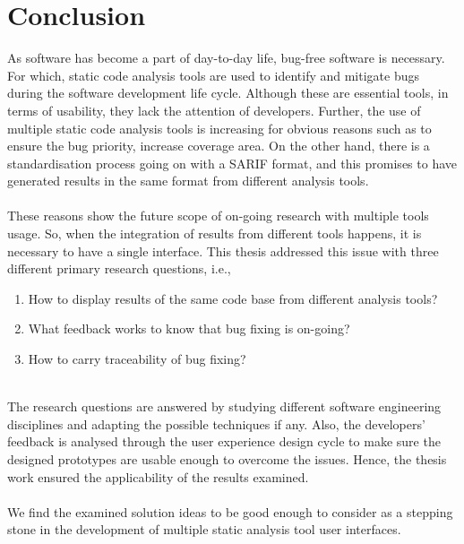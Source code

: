 \chapter{Conclusion}
\label{ch:conclusion_report}

As software has become a part of day-to-day life, bug-free software is necessary. For which, static code analysis tools are used to identify and mitigate bugs during the software development life cycle. Although these are essential tools, in terms of usability, they lack the attention of developers. Further, the use of multiple static code analysis tools is increasing for obvious reasons such as to ensure the bug priority, increase coverage area. On the other hand, there is a standardisation process going on with a SARIF format, \cite{sarif-git} and this promises to have generated results in the same format from different analysis tools. \\ \\

These reasons show the future scope of on-going research with multiple tools usage. So, when the integration of results from different tools happens, it is necessary to have a single interface. This thesis addressed this issue with three different primary research questions, i.e., \\ 
\begin{enumerate}
\item  How to display results of the same code base from different analysis tools?
\item  What feedback works to know that bug fixing is on-going?
\item  How to carry traceability of bug fixing? \\ \\
\end{enumerate}
The research questions are answered by studying different software engineering disciplines and adapting the possible techniques if any. Also, the developers’ feedback is analysed through the user experience design cycle to make sure the designed prototypes are usable enough to overcome the issues. Hence, the thesis work ensured the applicability of the results examined. \\ \\

We find the examined solution ideas to be good enough to consider as a stepping stone in the development of multiple static analysis tool user interfaces. \\ \\

\let\cleardoublepage\clearpage